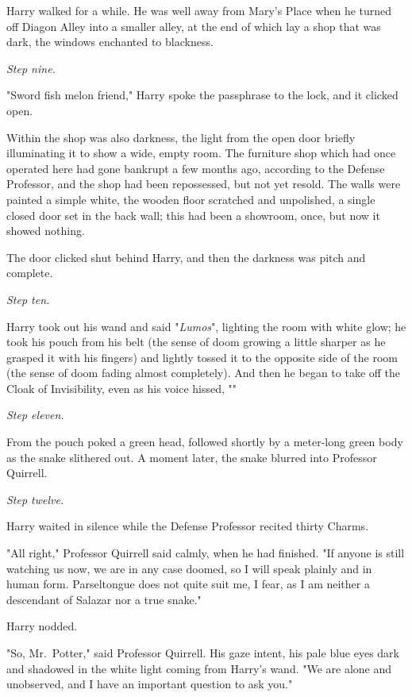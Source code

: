 Harry walked for a while. He was well away from Mary's Place when he turned off 
Diagon Alley into a smaller alley, at the end of which lay a shop that was 
dark, the windows enchanted to blackness.

\emph{Step nine.}

"Sword fish melon friend," Harry spoke the passphrase to the lock, and it 
clicked open.

Within the shop was also darkness, the light from the open door briefly 
illuminating it to show a wide, empty room. The furniture shop which had once 
operated here had gone bankrupt a few months ago, according to the Defense 
Professor, and the shop had been repossessed, but not yet resold. The walls 
were painted a simple white, the wooden floor scratched and unpolished, a 
single closed door set in the back wall; this had been a showroom, once, but 
now it showed nothing.

The door clicked shut behind Harry, and then the darkness was pitch and 
complete.

\emph{Step ten.}

Harry took out his wand and said "\emph{Lumos}", lighting the room with white 
glow; he took his pouch from his belt (the sense of doom growing a little 
sharper as he grasped it with his fingers) and lightly tossed it to the 
opposite side of the room (the sense of doom fading almost completely). And 
then he began to take off the Cloak of Invisibility, even as his voice hissed, 
""

\emph{Step eleven.}

From the pouch poked a green head, followed shortly by a meter-long green body 
as the snake slithered out. A moment later, the snake blurred into Professor 
Quirrell.

\emph{Step twelve.}

Harry waited in silence while the Defense Professor recited thirty Charms.

"All right," Professor Quirrell said calmly, when he had finished. "If anyone 
is still watching us now, we are in any case doomed, so I will speak plainly 
and in human form. Parseltongue does not quite suit me, I fear, as I am neither 
a descendant of Salazar nor a true snake."

Harry nodded.

"So, Mr.~Potter," said Professor Quirrell. His gaze intent, his pale blue eyes 
dark and shadowed in the white light coming from Harry's wand. "We are alone 
and unobserved, and I have an important question to ask you."


